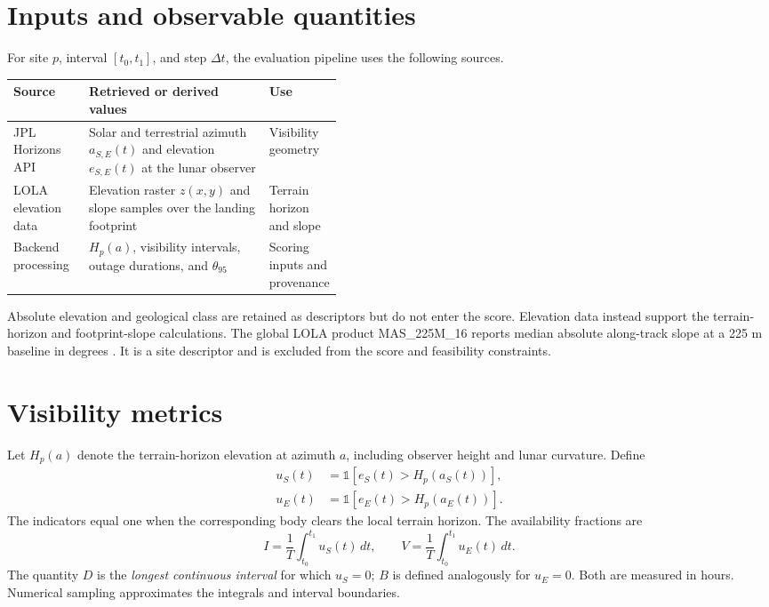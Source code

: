 \documentclass[10pt,a4paper]{article}
\newcommand{\code}[1]{{\ttfamily\small #1}}
\begin{document}
\section{Inputs and observable quantities}
For site $p$, interval $[t_0,t_1]$, and step $\Delta t$, the evaluation pipeline uses the following sources.

\small
\begin{tabularx}{\linewidth}{@{}L{0.23\linewidth}Y L{0.20\linewidth}@{}}
\toprule
\textbf{Source} & \textbf{Retrieved or derived values} & \textbf{Use}\\
\midrule
JPL Horizons API \cite{horizons} & Solar and terrestrial azimuth $a_{S,E}(t)$ and elevation $e_{S,E}(t)$ at the lunar observer & Visibility geometry\\
LOLA elevation data \cite{smith2010} & Elevation raster $z(x,y)$ and slope samples over the landing footprint & Terrain horizon and slope\\
Backend processing & $H_p(a)$, visibility intervals, outage durations, and $\theta_{95}$ & Scoring inputs and provenance\\
\bottomrule
\end{tabularx}
\normalsize

Absolute elevation and geological class are retained as descriptors but do not enter the score. Elevation data instead support the terrain-horizon and footprint-slope calculations. The global LOLA product \code{MAS\_225M\_16} reports median absolute along-track slope at a 225 m baseline in degrees \cite{rosenburg2011,pgda}. It is a site descriptor and is excluded from the score and feasibility constraints.

\newpage

\section{Visibility metrics}
Let $H_p(a)$ denote the terrain-horizon elevation at azimuth $a$, including observer height and lunar curvature. Define
\begin{align}
u_S(t)&=\mathbb{1}\!\left[e_S(t)>H_p(a_S(t))\right],\\
u_E(t)&=\mathbb{1}\!\left[e_E(t)>H_p(a_E(t))\right].
\end{align}
The indicators equal one when the corresponding body clears the local terrain horizon. The availability fractions are
\begin{equation}
I=\frac{1}{T}\int_{t_0}^{t_1}u_S(t)\,dt,
\qquad
V=\frac{1}{T}\int_{t_0}^{t_1}u_E(t)\,dt.
\end{equation}
The quantity $D$ is the \emph{longest continuous interval} for which $u_S=0$; $B$ is defined analogously for $u_E=0$. Both are measured in hours. Numerical sampling approximates the integrals and interval boundaries.
\end{document}
